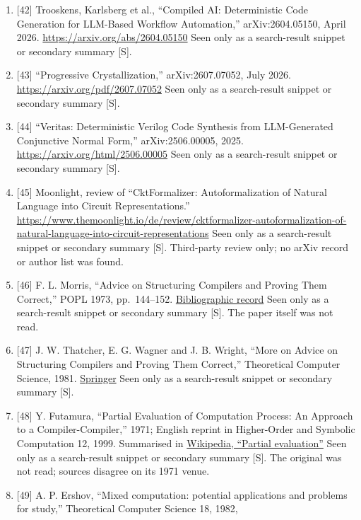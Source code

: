 \documentclass[10pt,letterpaper]{article}
\begin{document}
\begin{enumerate}
\item
  {[}42{]} Trooskens, Karlsberg et al., ``Compiled AI: Deterministic
  Code Generation for LLM-Based Workflow Automation,'' arXiv:2604.05150,
  April 2026. \url{https://arxiv.org/abs/2604.05150} Seen only as a
  search-result snippet or secondary summary {[}S{]}.
\item
  {[}43{]} ``Progressive Crystallization,'' arXiv:2607.07052, July 2026.
  \url{https://arxiv.org/pdf/2607.07052} Seen only as a search-result
  snippet or secondary summary {[}S{]}.
\item
  {[}44{]} ``Veritas: Deterministic Verilog Code Synthesis from
  LLM-Generated Conjunctive Normal Form,'' arXiv:2506.00005, 2025.
  \url{https://arxiv.org/html/2506.00005} Seen only as a search-result
  snippet or secondary summary {[}S{]}.
\item
  {[}45{]} Moonlight, review of ``CktFormalizer: Autoformalization of
  Natural Language into Circuit Representations.''
  \url{https://www.themoonlight.io/de/review/cktformalizer-autoformalization-of-natural-language-into-circuit-representations}
  Seen only as a search-result snippet or secondary summary {[}S{]}.
  Third-party review only; no arXiv record or author list was found.
\item
  {[}46{]} F. L. Morris, ``Advice on Structuring Compilers and Proving
  Them Correct,'' POPL 1973, pp.~144--152.
  \href{https://bibtex.github.io/POPL-1973-Morris73a.html}{Bibliographic
  record} Seen only as a search-result snippet or secondary summary
  {[}S{]}. The paper itself was not read.
\item
  {[}47{]} J. W. Thatcher, E. G. Wagner and J. B. Wright, ``More on
  Advice on Structuring Compilers and Proving Them Correct,''
  Theoretical Computer Science, 1981.
  \href{https://link.springer.com/content/pdf/10.1007/3-540-10250-7_22.pdf}{Springer}
  Seen only as a search-result snippet or secondary summary {[}S{]}.
\item
  {[}48{]} Y. Futamura, ``Partial Evaluation of Computation Process: An
  Approach to a Compiler-Compiler,'' 1971; English reprint in
  Higher-Order and Symbolic Computation 12, 1999. Summarised in
  \href{https://en.wikipedia.org/wiki/Partial_evaluation}{Wikipedia,
  ``Partial evaluation''} Seen only as a search-result snippet or
  secondary summary {[}S{]}. The original was not read; sources disagree
  on its 1971 venue.
\item
  {[}49{]} A. P. Ershov, ``Mixed computation: potential applications and
  problems for study,'' Theoretical Computer Science 18, 1982,

\end{enumerate}
\end{document}
